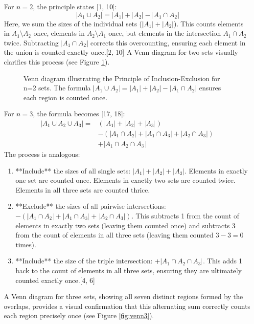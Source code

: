 \documentclass[11pt]{amsart}
\theoremstyle{plain}
\theoremstyle{definition}
\theoremstyle{remark}
\begin{document}
For $n=2$, the principle states [1, 10]:
\[ |A_1 \cup A_2| = |A_1| + |A_2| - |A_1 \cap A_2| \]
Here, we sum the sizes of the individual sets ($|A_1| + |A_2|$). This counts elements in $A_1 \setminus A_2$ once, elements in $A_2 \setminus A_1$ once, but elements in the intersection $A_1 \cap A_2$ twice. Subtracting $|A_1 \cap A_2|$ corrects this overcounting, ensuring each element in the union is counted exactly once.[2, 10] A Venn diagram for two sets visually clarifies this process (see Figure \ref{fig:venn2}).

\begin{figure}[ht]
    \centering
    \caption{Venn diagram illustrating the Principle of Inclusion-Exclusion for n=2 sets. The formula $|A_1 \cup A_2| = |A_1| + |A_2| - |A_1 \cap A_2|$ ensures each region is counted once.}
    \label{fig:venn2}
\end{figure}

For $n=3$, the formula becomes [17, 18]:
\begin{align*} |A_1 \cup A_2 \cup A_3| = &(|A_1| + |A_2| + |A_3|) \\ &- (|A_1 \cap A_2| + |A_1 \cap A_3| + |A_2 \cap A_3|) \\ &+ |A_1 \cap A_2 \cap A_3| \end{align*}
The process is analogous:
\begin{enumerate}
    \item **Include** the sizes of all single sets: $|A_1| + |A_2| + |A_3|$. Elements in exactly one set are counted once. Elements in exactly two sets are counted twice. Elements in all three sets are counted thrice.
    \item **Exclude** the sizes of all pairwise intersections: $- (|A_1 \cap A_2| + |A_1 \cap A_3| + |A_2 \cap A_3|)$. This subtracts 1 from the count of elements in exactly two sets (leaving them counted once) and subtracts 3 from the count of elements in all three sets (leaving them counted $3-3=0$ times).
    \item **Include** the size of the triple intersection: $+ |A_1 \cap A_2 \cap A_3|$. This adds 1 back to the count of elements in all three sets, ensuring they are ultimately counted exactly once.[4, 6]
\end{enumerate}
A Venn diagram for three sets, showing all seven distinct regions formed by the overlaps, provides a visual confirmation that this alternating sum correctly counts each region precisely once (see Figure \ref{fig:venn3}).
\end{document}
